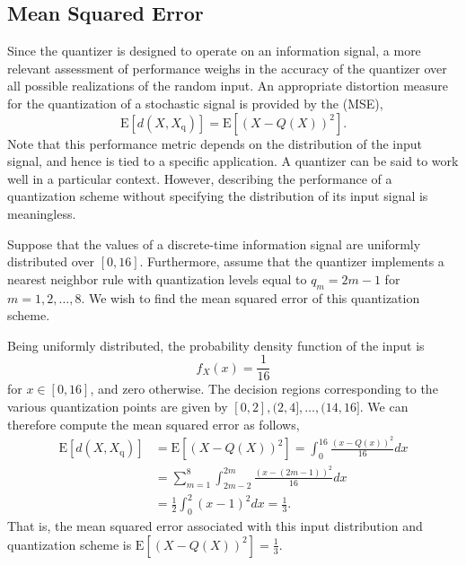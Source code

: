 \subsection{Mean Squared Error}

Since the quantizer is designed to operate on an information signal, a more relevant assessment of performance weighs in the accuracy of the quantizer over all possible realizations of the random input.
An appropriate distortion measure for the quantization of a stochastic signal is provided by the  (MSE),
\begin{equation} \label{equation:QuantizationMSE}
\mathrm{E} [ d(X, X_{\mathrm{q}}) ]
= \mathrm{E} \left[ \left( X - Q(X) \right)^2 \right] .
\end{equation}
Note that this performance metric depends on the distribution of the input signal, and hence is tied to a specific application.
A quantizer can be said to work well in a particular context.
However, describing the performance of a quantization scheme without specifying the distribution of its input signal is meaningless.

\begin{example} \label{example:UniformQuantizer}
Suppose that the values of a discrete-time information signal are uniformly distributed over $[0,16]$.
Furthermore, assume that the quantizer implements a nearest neighbor rule with quantization levels equal to $q_m = 2m - 1$ for $m = 1, 2, \ldots, 8$.
We wish to find the mean squared error of this quantization scheme.

Being uniformly distributed, the probability density function of the input is
\begin{equation*}
f_X (x) = \frac{1}{16}
\end{equation*}
for $x \in [0, 16]$, and zero otherwise.
The decision regions corresponding to the various quantization points are given by $[0, 2], (2, 4], \ldots, (14, 16]$.
We can therefore compute the mean squared error as follows,
\begin{equation*}
\begin{split}
\mathrm{E} [ d(X, X_{\mathrm{q}}) ]
&= \mathrm{E} \left[ \left( X - Q(X) \right)^2 \right]
= \int_0^{16} \frac{(x - Q(x))^2}{16} dx \\
&= \sum_{m=1}^8 \int_{2m-2}^{2m} \frac{(x - (2m - 1))^2}{16} dx \\
&= \frac{1}{2} \int_{0}^{2} (x - 1)^2 dx = \frac{1}{3} .
\end{split}
\end{equation*}
That is, the mean squared error associated with this input distribution and quantization scheme is $\mathrm{E} \left[ (X - Q(X))^2 \right] = \frac{1}{3}$.
\end{example}



